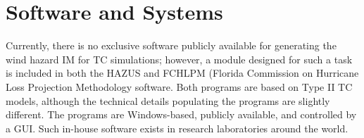 \section{Software and Systems}
\label{sec:storm_wind_tools}

Currently, there is no exclusive software publicly available for generating the wind hazard IM for TC simulations; however, a module designed for such a task is included in both the HAZUS \citep{vickery2006hazusmh} and FCHLPM (Florida Commission on Hurricane Loss Projection Methodology \citep{hamid2010predicting, powell2005state} software. Both programs are based on Type II TC models, although the technical details populating the programs are slightly different. The programs are Windows-based, publicly available, and controlled by a GUI. Such in-house software exists in research laboratories around the world.
